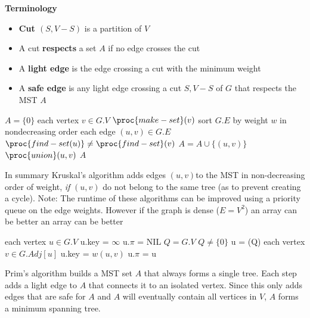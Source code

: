 \documentclass[../notes.tex]{subfiles}
\begin{document}
\begin{definition}
	\textbf{Terminology} 

	\begin{itemize}
		\item \textbf{Cut $ (S, V-S) $} is a partition of $ V $ 
		\item A cut \textbf{respects} a set $ A $ if no edge crosses the cut
		\item A \textbf{light edge} is the edge crossing a cut with the minimum weight
		\item A \textbf{safe edge} is any light edge crossing a cut $ S, V-S $ of $ G $ that respects the MST $ A $
	\end{itemize}
\end{definition}



\begin{codebox}
\li $ A = \{0\}  $
\li \For each vertex $ v \in G.V $ \Do
\li 	$\proc{make-set}(v)$
\li 	sort $ G.E $ by weight $ w $ in nondecreasing order
\li \For each edge $ (u, v) \in G.E $ \Do
\li \If $ \proc{find-set(u)} \neq \proc{find-set}(v)$ \Then
\li $ A = A \cup \{(u, v)\}  $
\li $ \proc{union}(u,v) $ \End \End \End
\li \Return $ A $
\end{codebox}


In summary Kruskal's algorithm adds edges $ (u,v) $to the MST in non-decreasing order of weight, \textit{if} $ (u,v) $ do not belong to the same tree (as to prevent creating a cycle).
Note: The runtime of these algorithms can be improved using a priority queue on the edge weights. However if the graph is dense ($ E = V^2 $) an array can be better an array can be better

\begin{codebox}
\li \For each vertex $ u \in G.V $ \Do
\li u.key = $\infty$
\li u.$\pi $  = NIL \End
\li $  Q = G.V $
\li \While $ Q \neq  \{0\}  $ \Do
\li u = (Q)
\li \For each vertex $ v \in G.Adj[u] $ \Do
\li u.key = $w(u,v)$
\li u.$\pi $  = u \End \End \End
\end{codebox}

Prim's algorithm builds a MST set $ A $ that always forms a single tree. Each step adds a light edge to $ A $ that connects it to an isolated vertex. Since this only adds edges that are safe for $ A $ and $ A $ will eventually contain all vertices in $ V $, $ A $ forms a minimum spanning tree.
\end{document}
